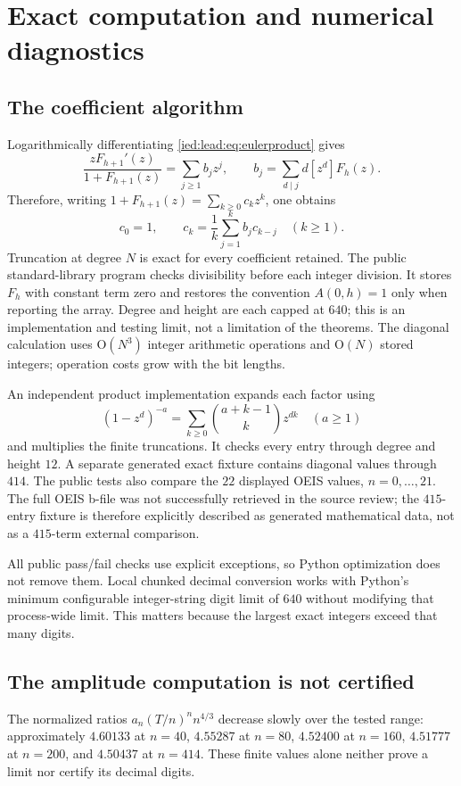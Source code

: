 \documentclass[11pt,letterpaper]{article}
\theoremstyle{remark}\newtheorem{remark}[theorem]{Remark}
\newcommand{\Oh}{\mathrm O}\newcommand{\supp}{\operatorname{supp}}
\begin{document}
\section{Exact computation and numerical diagnostics}\label{ied:lead:sec:computation}
\subsection{The coefficient algorithm}
Logarithmically differentiating \eqref{ied:lead:eq:eulerproduct} gives
\[
 \frac{zF_{h+1}'(z)}{1+F_{h+1}(z)}=\sum_{j\ge1}b_jz^j,
 \qquad b_j=\sum_{d\mid j}d[z^d]F_h(z).
\]
Therefore, writing $1+F_{h+1}(z)=\sum_{k\ge0}c_kz^k$, one obtains
\begin{equation}\label{ied:lead:eq:exactrec}
 c_0=1,\qquad c_k=\frac1k\sum_{j=1}^k b_jc_{k-j}\quad(k\ge1).
\end{equation}
Truncation at degree $N$ is exact for every coefficient retained. The public standard-library program checks divisibility before each integer division. It stores $F_h$ with constant term zero and restores the convention $A(0,h)=1$ only when reporting the array. Degree and height are each capped at $640$; this is an implementation and testing limit, not a limitation of the theorems. The diagonal calculation uses $\Oh(N^3)$ integer arithmetic operations and $\Oh(N)$ stored integers; operation costs grow with the bit lengths.

An independent product implementation expands each factor using
\[
 (1-z^d)^{-a}=\sum_{k\ge0}\binom{a+k-1}{k}z^{dk}\quad(a\ge1)
\]
and multiplies the finite truncations. It checks every entry through degree and height $12$. A separate generated exact fixture contains diagonal values through $414$. The public tests also compare the $22$ displayed OEIS values, $n=0,\ldots,21$. The full OEIS b-file was not successfully retrieved in the source review; the $415$-entry fixture is therefore explicitly described as generated mathematical data, not as a $415$-term external comparison.

All public pass/fail checks use explicit exceptions, so Python optimization does not remove them. Local chunked decimal conversion works with Python's minimum configurable integer-string digit limit of $640$ without modifying that process-wide limit. This matters because the largest exact integers exceed that many digits.

\subsection{The amplitude computation is not certified}\label{ied:lead:sub:notcertified}
The normalized ratios $a_n(T/n)^n n^{4/3}$ decrease slowly over the tested range: approximately $4.60133$ at $n=40$, $4.55287$ at $n=80$, $4.52400$ at $n=160$, $4.51777$ at $n=200$, and $4.50437$ at $n=414$. These finite values alone neither prove a limit nor certify its decimal digits.
\end{document}
